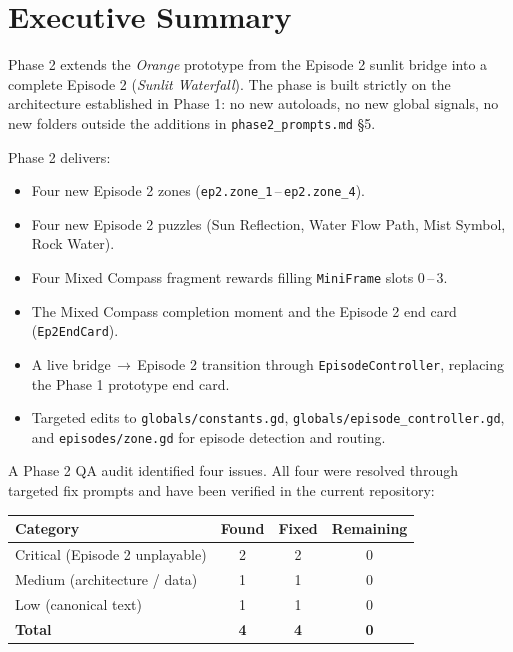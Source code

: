 \documentclass[12pt, a4paper]{article}
\begin{document}
\section{Executive Summary}

Phase 2 extends the \textit{Orange} prototype from the Episode 2 sunlit bridge
into a complete Episode 2 (\textit{Sunlit Waterfall}). The phase is built
strictly on the architecture established in Phase 1: no new autoloads, no new
global signals, no new folders outside the additions in
\texttt{phase2\_prompts.md} \S5.

Phase 2 delivers:

\begin{itemize}[nosep]
  \item Four new Episode 2 zones (\texttt{ep2.zone\_1}\,--\,\texttt{ep2.zone\_4}).
  \item Four new Episode 2 puzzles (Sun Reflection, Water Flow Path,
        Mist Symbol, Rock Water).
  \item Four Mixed Compass fragment rewards filling \texttt{MiniFrame} slots 0\,--\,3.
  \item The Mixed Compass completion moment and the Episode 2 end card
        (\texttt{Ep2EndCard}).
  \item A live bridge\,$\to$\,Episode 2 transition through
        \texttt{EpisodeController}, replacing the Phase 1 prototype end card.
  \item Targeted edits to \texttt{globals/constants.gd},
        \texttt{globals/episode\_controller.gd}, and
        \texttt{episodes/zone.gd} for episode detection and routing.
\end{itemize}

A Phase 2 QA audit identified four issues. All four were resolved through
targeted fix prompts and have been verified in the current repository:

\begin{center}
\begin{tabular}{lccc}
\toprule
\textbf{Category} & \textbf{Found} & \textbf{Fixed} & \textbf{Remaining} \\
\midrule
Critical (Episode 2 unplayable) & 2 & 2 & 0 \\
Medium (architecture / data)    & 1 & 1 & 0 \\
Low (canonical text)            & 1 & 1 & 0 \\
\midrule
\textbf{Total}                  & \textbf{4} & \textbf{4} & \textbf{0} \\
\bottomrule
\end{tabular}
\end{center}
\end{document}
